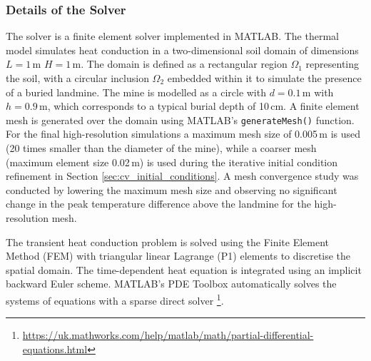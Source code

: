     
    \subsubsection{Details of the Solver}
    
        The solver is a finite element solver implemented in MATLAB. The thermal model simulates heat conduction in a two-dimensional soil domain of dimensions $L =1$\,m $H = 1$\,m. The domain is defined as a rectangular region $\Omega_1$ representing the soil, with a circular inclusion $\Omega_2$ embedded within it to simulate the presence of a buried landmine. The mine is modelled as a circle with \(d=0.1\,\text{m}\) with \(h=0.9\,\text{m}\), which corresponds to a typical burial depth of 10\,cm. A finite element mesh is generated over the domain using MATLAB's \texttt{generateMesh()} function. For the final high-resolution simulations a maximum mesh size of 0.005\,m is used (20 times smaller than the diameter of the mine), while a coarser mesh (maximum element size 0.02\,m) is used during the iterative initial condition refinement in Section \ref{sec:cv_initial_conditions}. A mesh convergence study was conducted by lowering the maximum mesh size and observing no significant change in the peak temperature difference above the landmine for the high-resolution mesh.
        
        The transient heat conduction problem is solved using the Finite Element Method (FEM) with triangular linear Lagrange (P1) elements to discretise the spatial domain. The time-dependent heat equation is integrated using an implicit backward Euler scheme. MATLAB's PDE Toolbox automatically solves the systems of equations with a sparse direct solver \footnote{\url{https://uk.mathworks.com/help/matlab/math/partial-differential-equations.html}}.
    

